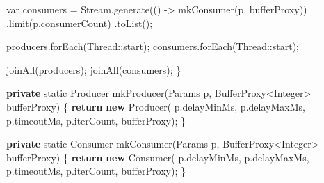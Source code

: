 \documentclass[11pt]{article}
\newenvironment{Shaded}{}{}
\newcommand{\KeywordTok}[1]{\textcolor[rgb]{0.00,0.44,0.13}{\textbf{{#1}}}}
\newcommand{\DataTypeTok}[1]{\textcolor[rgb]{0.56,0.13,0.00}{{#1}}}
\newcommand{\FunctionTok}[1]{\textcolor[rgb]{0.02,0.16,0.49}{{#1}}}
\newcommand{\NormalTok}[1]{{#1}}
\newcommand{\ControlFlowTok}[1]{\textcolor[rgb]{0.00,0.44,0.13}{\textbf{{#1}}}}
\newcommand{\OperatorTok}[1]{\textcolor[rgb]{0.40,0.40,0.40}{{#1}}}
\newcommand{\BuiltInTok}[1]{{#1}}
\begin{document}
\begin{Shaded}
\begin{Highlighting}[]
        \DataTypeTok{var}\NormalTok{ consumers }\OperatorTok{=}\NormalTok{ Stream}\OperatorTok{.}\FunctionTok{generate}\OperatorTok{(()} \OperatorTok{{-}\textgreater{}} \FunctionTok{mkConsumer}\OperatorTok{(}\NormalTok{p}\OperatorTok{,}\NormalTok{ bufferProxy}\OperatorTok{))}
                \OperatorTok{.}\FunctionTok{limit}\OperatorTok{(}\NormalTok{p}\OperatorTok{.}\FunctionTok{consumerCount}\OperatorTok{)}
                \OperatorTok{.}\FunctionTok{toList}\OperatorTok{();}

\NormalTok{        producers}\OperatorTok{.}\FunctionTok{forEach}\OperatorTok{(}\BuiltInTok{Thread}\OperatorTok{::}\NormalTok{start}\OperatorTok{);}
\NormalTok{        consumers}\OperatorTok{.}\FunctionTok{forEach}\OperatorTok{(}\BuiltInTok{Thread}\OperatorTok{::}\NormalTok{start}\OperatorTok{);}

        \FunctionTok{joinAll}\OperatorTok{(}\NormalTok{producers}\OperatorTok{);}
        \FunctionTok{joinAll}\OperatorTok{(}\NormalTok{consumers}\OperatorTok{);}
    \OperatorTok{\}}

    \KeywordTok{private} \DataTypeTok{static}\NormalTok{ Producer }\FunctionTok{mkProducer}\OperatorTok{(}\NormalTok{Params p}\OperatorTok{,}\NormalTok{ BufferProxy}\OperatorTok{\textless{}}\BuiltInTok{Integer}\OperatorTok{\textgreater{}}\NormalTok{ bufferProxy}\OperatorTok{)} \OperatorTok{\{}
        \ControlFlowTok{return} \KeywordTok{new} \FunctionTok{Producer}\OperatorTok{(}
\NormalTok{            p}\OperatorTok{.}\FunctionTok{delayMinMs}\OperatorTok{,}\NormalTok{ p}\OperatorTok{.}\FunctionTok{delayMaxMs}\OperatorTok{,}\NormalTok{ p}\OperatorTok{.}\FunctionTok{timeoutMs}\OperatorTok{,}\NormalTok{ p}\OperatorTok{.}\FunctionTok{iterCount}\OperatorTok{,}\NormalTok{ bufferProxy}\OperatorTok{);}
    \OperatorTok{\}}

    \KeywordTok{private} \DataTypeTok{static}\NormalTok{ Consumer }\FunctionTok{mkConsumer}\OperatorTok{(}\NormalTok{Params p}\OperatorTok{,}\NormalTok{ BufferProxy}\OperatorTok{\textless{}}\BuiltInTok{Integer}\OperatorTok{\textgreater{}}\NormalTok{ bufferProxy}\OperatorTok{)} \OperatorTok{\{}
        \ControlFlowTok{return} \KeywordTok{new} \FunctionTok{Consumer}\OperatorTok{(}
\NormalTok{            p}\OperatorTok{.}\FunctionTok{delayMinMs}\OperatorTok{,}\NormalTok{ p}\OperatorTok{.}\FunctionTok{delayMaxMs}\OperatorTok{,}\NormalTok{ p}\OperatorTok{.}\FunctionTok{timeoutMs}\OperatorTok{,}\NormalTok{ p}\OperatorTok{.}\FunctionTok{iterCount}\OperatorTok{,}\NormalTok{ bufferProxy}\OperatorTok{);}
    \OperatorTok{\}}


\end{Highlighting}
\end{Shaded}
\end{document}
